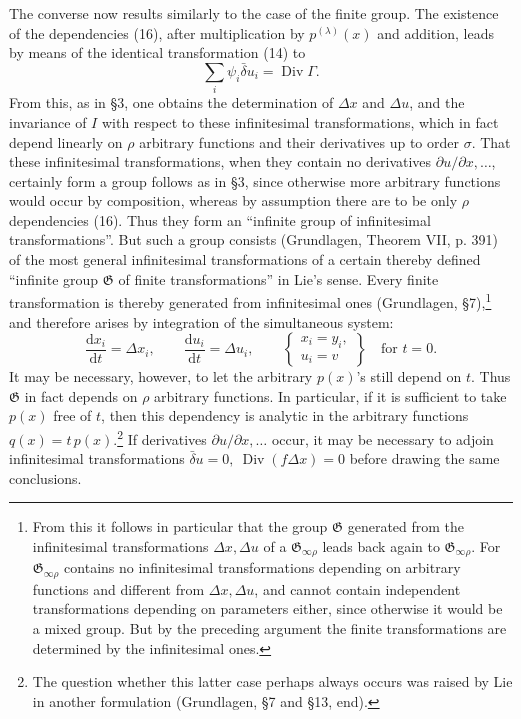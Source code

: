 \documentclass[11pt]{article}
\newcommand{\D}{\Delta}
\providecommand{\dd}{\mathrm d}
\providecommand{\Div}{\operatorname{Div}}
\providecommand{\G}{\mathfrak G}
\providecommand{\bd}{\bar{\delta}}
\providecommand{\p}{\partial}
\begin{document}
The converse now results similarly to the case of the finite group. The existence of the dependencies (16), after multiplication by \(p^{(\lambda)}(x)\) and addition, leads by means of the identical transformation (14) to
\[
\sum_i\psi_i\bd u_i=\Div\Gamma.
\]
From this, as in \S{}3, one obtains the determination of \(\D x\) and \(\D u\), and the invariance of \(I\) with respect to these infinitesimal transformations, which in fact depend linearly on \(\rho\) arbitrary functions and their derivatives up to order \(\sigma\). That these infinitesimal transformations, when they contain no derivatives \(\p u/\p x,\ldots\), certainly form a group follows as in \S{}3, since otherwise more arbitrary functions would occur by composition, whereas by assumption there are to be only \(\rho\) dependencies (16). Thus they form an ``infinite group of infinitesimal transformations''. But such a group consists (Grundlagen, Theorem VII, p. 391) of the most general infinitesimal transformations of a certain thereby defined ``infinite group \(\G\) of finite transformations'' in Lie's sense. Every finite transformation is thereby generated from infinitesimal ones (Grundlagen, \S{}7),\footnote{From this it follows in particular that the group \(\G\) generated from the infinitesimal transformations \(\D x,\D u\) of a \(\G_{\infty\rho}\) leads back again to \(\G_{\infty\rho}\). For \(\G_{\infty\rho}\) contains no infinitesimal transformations depending on arbitrary functions and different from \(\D x,\D u\), and cannot contain independent transformations depending on parameters either, since otherwise it would be a mixed group. But by the preceding argument the finite transformations are determined by the infinitesimal ones.} and therefore arises by integration of the simultaneous system:
\[
\frac{\dd x_i}{\dd t}=\D x_i,\qquad
\frac{\dd u_i}{\dd t}=\D u_i,\qquad
\left\{\begin{array}{l}
x_i=y_i,\\
u_i=v
\end{array}\right\}
\quad\text{for }t=0.
\]
It may be necessary, however, to let the arbitrary \(p(x)\)'s still depend on \(t\). Thus \(\G\) in fact depends on \(\rho\) arbitrary functions. In particular, if it is sufficient to take \(p(x)\) free of \(t\), then this dependency is analytic in the arbitrary functions \(q(x)=t\,p(x)\).\footnote{The question whether this latter case perhaps always occurs was raised by Lie in another formulation (Grundlagen, \S{}7 and \S{}13, end).} If derivatives \(\p u/\p x,\ldots\) occur, it may be necessary to adjoin infinitesimal transformations \(\bd u=0,\ \Div(f\D x)=0\) before drawing the same conclusions.
\end{document}
